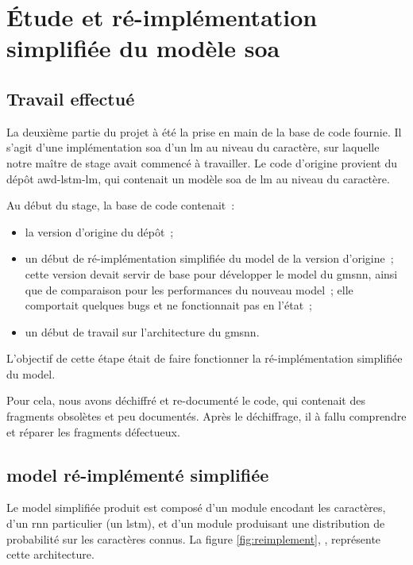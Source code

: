 \section{Étude et ré-implémentation simplifiée du modèle \gls{soa}}
\subsection{Travail effectué}\label{subsec:codebase}
La deuxième partie du projet à été la prise en main de la base de code fournie.
Il s'agit d'une implémentation \gls{soa} d'un \gls{lm} au niveau du caractère, sur laquelle notre maître de stage avait commencé à travailler.
Le code d'origine provient du dépôt \og awd-lstm-lm\fg{}\autocite{awd_source}, qui contenait un modèle \gls{soa} de \gls{lm} au niveau du caractère.

Au début du stage, la base de code contenait~:
\begin{itemize}
	\item la version d'origine du dépôt~;
	\item un début de ré-implémentation simplifiée du \gls{model} de la version d'origine~; cette version  devait servir de base pour développer le \gls{model} du \gls{gmsnn}, ainsi que de comparaison pour les performances du nouveau \gls{model}~; elle comportait quelques \glspl{bug} et ne fonctionnait pas en l'état~;
	\item un début de travail sur l'architecture du \gls{gmsnn}.
\end{itemize}

\vspace{1em}
L'objectif de cette étape était de faire fonctionner la ré-implémentation simplifiée du \gls{model}.

Pour cela, nous avons déchiffré et re-documenté le code, qui contenait des fragments obsolètes et peu documentés.
Après le déchiffrage, il à fallu comprendre et réparer les fragments défectueux.

\pagebreak
\subsection[\Glsentrytext{model} ré-implémenté simplifiée]{\Gls{model} ré-implémenté simplifiée}
Le \gls{model} simplifiée produit est composé d'un module encodant les caractères, d'un \gls{rnn} particulier (un \gls{lstm}), et d'un module produisant une distribution de probabilité sur les caractères connus. La figure \ref{fig:reimplement}, , représente cette architecture.

